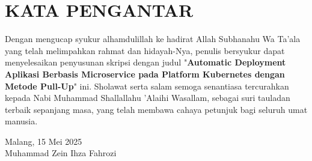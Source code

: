  {}
\chapter*{\uppercase{KATA PENGANTAR}}

Dengan mengucap syukur alhamdulillah ke hadirat Allah Subhanahu Wa Ta'ala yang telah melimpahkan rahmat dan hidayah-Nya, penulis bersyukur dapat menyelesaikan penyusunan skripsi dengan judul "\textbf{Automatic Deployment Aplikasi Berbasis Microservice pada Platform Kubernetes dengan Metode Pull-Up}" ini. Sholawat serta salam semoga senantiasa tercurahkan kepada Nabi Muhammad Shallallahu 'Alaihi Wasallam, sebagai suri tauladan terbaik sepanjang masa, yang telah membawa cahaya petunjuk bagi seluruh umat manusia.


\begin{flushright}
    Malang, 15 Mei 2025 \\[3cm] %
    Muhammad Zein Ihza Fahrozi
\end{flushright}


\newpage
